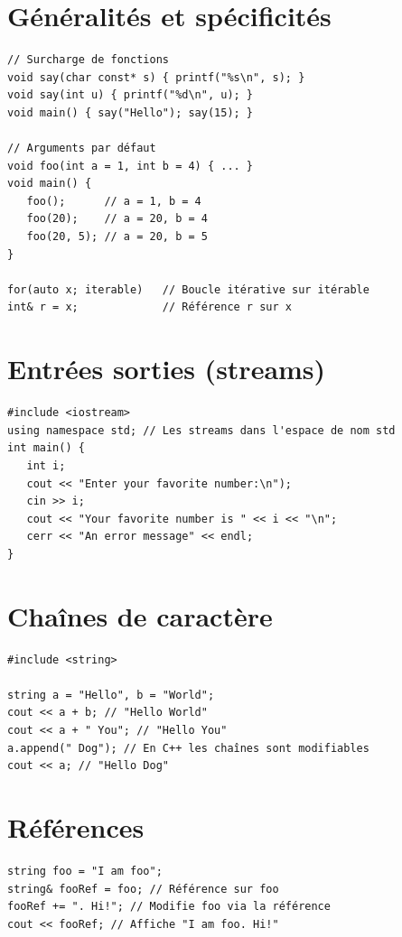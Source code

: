 \documentclass{article}
\begin{document}
\begin{multicols*}{3}
    \section*{Généralités et spécificités}

    \begin{lstlisting}
// Surcharge de fonctions
void say(char const* s) { printf("%s\n", s); }
void say(int u) { printf("%d\n", u); }
void main() { say("Hello"); say(15); }

// Arguments par défaut
void foo(int a = 1, int b = 4) { ... }
void main() {
   foo();      // a = 1, b = 4
   foo(20);    // a = 20, b = 4
   foo(20, 5); // a = 20, b = 5
}

for(auto x; iterable)   // Boucle itérative sur itérable
int& r = x;             // Référence r sur x
\end{lstlisting}

    \section*{Entrées sorties (streams)}

    \begin{lstlisting}
#include <iostream>
using namespace std; // Les streams dans l'espace de nom std
int main() {
   int i;
   cout << "Enter your favorite number:\n");
   cin >> i;
   cout << "Your favorite number is " << i << "\n";
   cerr << "An error message" << endl;
}
\end{lstlisting}

    \section*{Chaînes de caractère}

    \begin{lstlisting}
#include <string>

string a = "Hello", b = "World";
cout << a + b; // "Hello World"
cout << a + " You"; // "Hello You"
a.append(" Dog"); // En C++ les chaînes sont modifiables
cout << a; // "Hello Dog"
\end{lstlisting}

    \section*{Références}

    \begin{lstlisting}
string foo = "I am foo";
string& fooRef = foo; // Référence sur foo
fooRef += ". Hi!"; // Modifie foo via la référence
cout << fooRef; // Affiche "I am foo. Hi!"


\end{lstlisting}
\end{multicols*}
\end{document}
